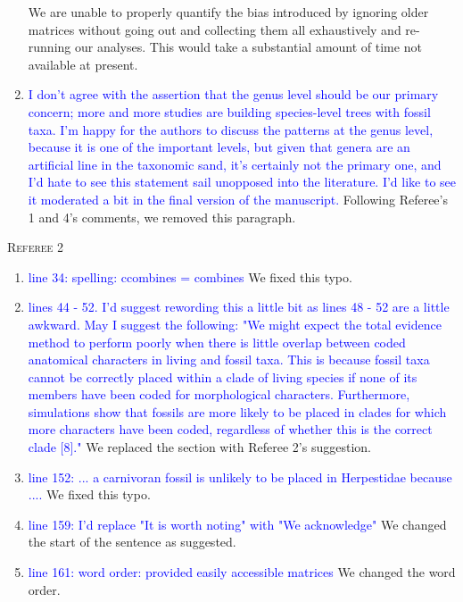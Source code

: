 \documentclass[12pt,letterpaper]{article}
\renewcommand{\section}[1]{%
\bigskip
\begin{center}
\begin{Large}
\normalfont\scshape #1
\medskip
\end{Large}
\end{center}}
\begin{document}
\begin{enumerate}
We are unable to properly quantify the bias introduced by ignoring older matrices without going out and collecting them all exhaustively and re-running our analyses. This would take a substantial amount of time not available at present.


\item{\textcolor{blue}{I don't agree with the assertion that the genus level should be our primary concern; more and more studies are building species-level trees with fossil taxa. I'm happy for the authors to discuss the patterns at the genus level, because it is one of the important levels, but given that genera are an artificial line in the taxonomic sand, it's certainly not the primary one, and I'd hate to see this statement sail unopposed into the literature. I'd like to see it moderated a bit in the final version of the manuscript.}}
Following Referee's 1 and 4's comments, we removed this paragraph.

\end{enumerate}
\section{Referee 2}

\begin{enumerate}
\item{\textcolor{blue}{line 34: spelling: ccombines = combines}}
We fixed this typo.

\item{\textcolor{blue}{lines 44 - 52. I'd suggest rewording this a little bit as lines 48 - 52 are a little awkward. May I suggest the following:
"We might expect the total evidence method to perform poorly when there is little overlap between coded anatomical characters in living and fossil taxa. This is because fossil taxa cannot be correctly placed within a clade of living species if none of its members have been coded for morphological characters. Furthermore, simulations show that fossils are more likely to be placed in clades for which more characters have been coded, regardless of whether this is the correct clade [8]."}}
We replaced the section with Referee 2's suggestion.

\item{\textcolor{blue}{line 152: ... a carnivoran fossil is unlikely to be placed in Herpestidae because ....}}
We fixed this typo.

\item{\textcolor{blue}{line 159: I'd replace "It is worth noting" with "We acknowledge"}}
We changed the start of the sentence as suggested.

\item{\textcolor{blue}{line 161: word order: provided easily accessible matrices}}
We changed the word order.

\end{enumerate}
\end{document}
